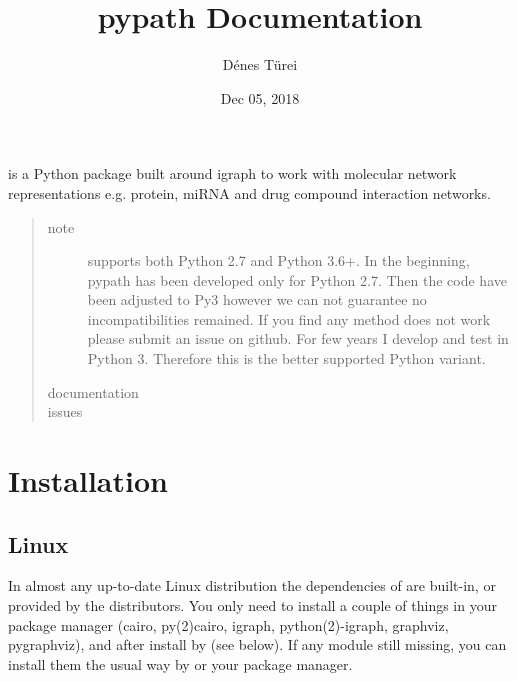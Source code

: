 \documentclass[letterpaper,10pt,english]{sphinxmanual}
\title{pypath Documentation}
\date{Dec 05, 2018}
\author{Dénes Türei}
\begin{document}
\maketitle
\sphinxtableofcontents
{}\label{\detokenize{index::doc}}


 is a Python package built around igraph to work with molecular
network representations e.g. protein, miRNA and drug compound interaction
networks.
\begin{quote}\begin{description}
\item[{note}] \leavevmode
{} supports both Python 2.7 and Python 3.6+. In the beginning,
pypath has been developed only for Python 2.7. Then the code have been
adjusted to Py3 however we can not guarantee no incompatibilities
remained. If you find any method does not work please submit an issue on
github. For few years I develop and test  in Python 3. Therefore
this is the better supported Python variant.

\item[{documentation}] \leavevmode
{}

\item[{issues}] \leavevmode
{}

\end{description}\end{quote}


\chapter{Installation}
\label{\detokenize{installation:installation}}\label{\detokenize{installation::doc}}

\section{Linux}
\label{\detokenize{installation:linux}}
In almost any up-to-date Linux distribution the dependencies of  are
built-in, or provided by the distributors. You only need to install a couple
of things in your package manager (cairo, py(2)cairo, igraph,
python(2)-igraph, graphviz, pygraphviz), and after install  by 
(see below). If any module still missing, you can install them the usual way
by  or your package manager.
\end{document}

